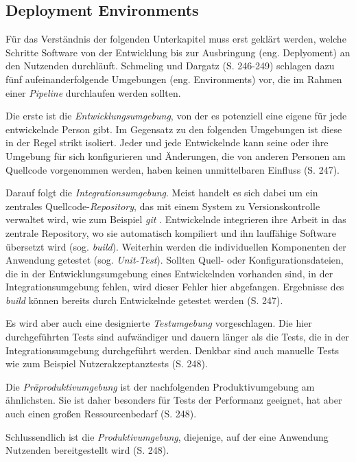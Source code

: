 \documentclass[11pt,a4paper]{article}
\begin{document}
\subsection{Deployment Environments}
Für das Verständnis der folgenden Unterkapitel muss erst geklärt werden,
welche Schritte Software von der Entwicklung bis zur Ausbringung (eng. Deplyoment) an den
Nutzenden durchläuft.
Schmeling und Dargatz \cite{Schmeling_Dargatz_2022} (S. 246-249) schlagen dazu
fünf aufeinanderfolgende Umgebungen (eng. Environments) vor, die im Rahmen
einer \emph{Pipeline} durchlaufen werden sollten.

Die erste ist die \emph{Entwicklungsumgebung}, von der es potenziell
eine eigene für jede entwickelnde Person gibt. Im Gegensatz zu den folgenden
Umgebungen ist diese in der Regel strikt isoliert. Jeder und jede Entwickelnde
kann seine oder ihre Umgebung für sich konfigurieren und Änderungen, die von anderen
Personen am Quellcode vorgenommen werden, haben keinen unmittelbaren Einfluss \cite{Schmeling_Dargatz_2022} (S. 247).

Darauf folgt die \emph{Integrationsumgebung}. Meist handelt es sich dabei
um ein zentrales Quellcode-\emph{Repository}, das mit einem System zu Versionskontrolle
verwaltet wird, wie zum Beispiel \emph{git} \cite{chacon2014pro}.
Entwickelnde integrieren ihre Arbeit in das zentrale Repository, wo sie
automatisch kompiliert und ihn lauffähige Software übersetzt wird (sog. \emph{build}).
Weiterhin werden die individuellen Komponenten der Anwendung getestet (sog. \emph{Unit-Test}).
Sollten Quell- oder Konfigurationsdateien, die in der Entwicklungsumgebung
eines Entwickelnden vorhanden sind, in der Integrationsumgebung fehlen,
wird dieser Fehler hier abgefangen.
Ergebnisse des \emph{build} können bereits durch Entwickelnde getestet werden \cite{Schmeling_Dargatz_2022} (S. 247).

Es wird aber auch eine designierte \emph{Testumgebung} vorgeschlagen.
Die hier durchgeführten Tests sind aufwändiger und dauern länger als
die Tests, die in der Integrationsumgebung durchgeführt werden.
Denkbar sind auch manuelle Tests wie zum Beispiel Nutzerakzeptanztests \cite{Schmeling_Dargatz_2022} (S. 248).

Die \emph{Präproduktivumgebung} ist der nachfolgenden Produktivumgebung am ähnlichsten.
Sie ist daher besonders für Tests der Performanz geeignet, hat
aber auch einen großen Ressourcenbedarf \cite{Schmeling_Dargatz_2022} (S. 248).

Schlussendlich ist die \emph{Produktivumgebung}, diejenige, auf der eine Anwendung
Nutzenden bereitgestellt wird \cite{Schmeling_Dargatz_2022} (S. 248).
\end{document}
